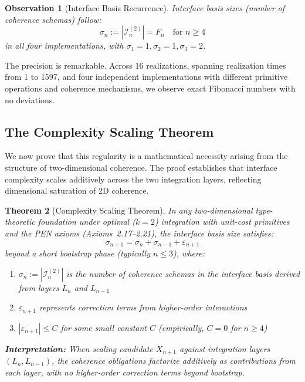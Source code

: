 \documentclass[11pt]{article}
\newtheorem{theorem}{Theorem}[section]
\newtheorem{observation}[theorem]{Observation}
\theoremstyle{definition}
\theoremstyle{remark}
\begin{document}
\begin{observation}[Interface Basis Recurrence]
\label{obs:interface-recurrence}
Interface basis sizes (number of coherence schemas) follow:
\[
\sigma_n := |\mathcal{I}_n^{(2)}| = F_n \quad \text{for } n \geq 4
\]
in all four implementations, with $\sigma_1 = 1, \sigma_2 = 1, \sigma_3 = 2$.
\end{observation}

The precision is remarkable. Across 16 realizations, spanning realization times from 1 to 1597,
and four independent implementations with different primitive operations and coherence mechanisms,
we observe exact Fibonacci numbers with no deviations.

\subsection{The Complexity Scaling Theorem}

We now prove that this regularity is a mathematical necessity arising from the structure of
two-dimensional coherence. The proof establishes that interface complexity scales additively across
the two integration layers, reflecting dimensional saturation of 2D coherence.

\begin{theorem}[Complexity Scaling Theorem]
\label{thm:CST}
In any two-dimensional type-theoretic foundation under optimal ($k=2$) integration with unit-cost
primitives and the PEN axioms (Axioms~2.17--2.21), the interface basis size satisfies:
\[
\sigma_{n+1} = \sigma_n + \sigma_{n-1} + \varepsilon_{n+1}
\]
beyond a short bootstrap phase (typically $n \leq 3$), where:
\begin{enumerate}
\item $\sigma_n := |\mathcal{I}_n^{(2)}|$ is the number of coherence schemas in the interface basis derived
from layers $L_n$ and $L_{n-1}$
\item $\varepsilon_{n+1}$ represents correction terms from higher-order interactions
\item $|\varepsilon_{n+1}| \leq C$ for some small constant $C$ (empirically, $C = 0$ for $n \geq 4$)
\end{enumerate}

\textbf{Interpretation:} When sealing candidate $X_{n+1}$ against integration layers $(L_n, L_{n-1})$, the
coherence obligations factorize additively as contributions from each layer, with no higher-order
correction terms beyond bootstrap.
\end{theorem}
\end{document}
